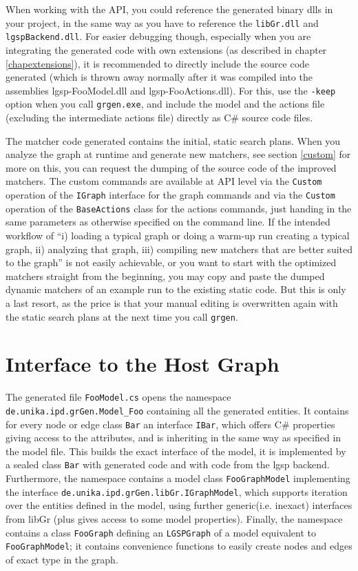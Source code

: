 When working with the API, you could reference the generated binary dlls in your project, in the same way as you have to reference the \texttt{libGr.dll} and \texttt{lgspBackend.dll}.
For easier debugging though, especially when you are integrating the generated code with own extensions (as described in chapter \ref{chapextensions}), it is recommended to directly include the source code generated (which is thrown away normally after it was compiled into the assemblies lgsp-FooModel.dll and lgsp-FooActions.dll).
For this, use the \texttt{-keep} option when you call \texttt{grgen.exe}, and include the model and the actions file (excluding the intermediate actions file) directly as C\# source code files.

The matcher code generated contains the initial, static search plans.
When you analyze the graph at runtime and generate new matchers, see section \ref{custom} for more on this, you can request the dumping of the source code of the improved matchers.
The custom commands are available at API level via the \texttt{Custom} operation of the \texttt{IGraph} interface for the graph commands and via the \texttt{Custom} operation of the \texttt{BaseActions} class for the actions commands, just handing in the same parameters as otherwise specified on the command line.
If the intended workflow of ``i) loading a typical graph or doing a warm-up run creating a typical graph, ii) analyzing that graph, iii) compiling new matchers that are better suited to the graph'' is not easily achievable, or you want to start with the optimized matchers straight from the beginning, you may copy and paste the dumped dynamic matchers of an example run to the existing static code. 
But this is only a last resort, as the price is that your manual editing is overwritten again with the static search plans at the next time you call \texttt{grgen}.


\section{Interface to the Host Graph}

The generated file \texttt{FooModel.cs} opens the namespace \texttt{de.unika.ipd.grGen.Model\_Foo} containing all the generated entities.
It contains for every node or edge class \texttt{Bar} an interface \texttt{IBar}, which offers C\# properties giving access to the attributes, and is inheriting in the same way as specified in the model file.
This builds the exact interface of the model, it is implemented by a sealed class \texttt{Bar} with generated code and with code from the lgsp backend.
Furthermore, the namespace contains a model class \texttt{FooGraphModel} implementing the interface \texttt{de.unika.ipd.grGen.libGr.IGraphModel},
which supports iteration over the entities defined in the model, using further generic(i.e. inexact) interfaces from libGr (plus gives access to some model properties).
Finally, the namespace contains a class \texttt{FooGraph} defining an \texttt{LGSPGraph} of a model equivalent to \texttt{FooGraphModel}; 
it contains convenience functions to easily create nodes and edges of exact type in the graph.


